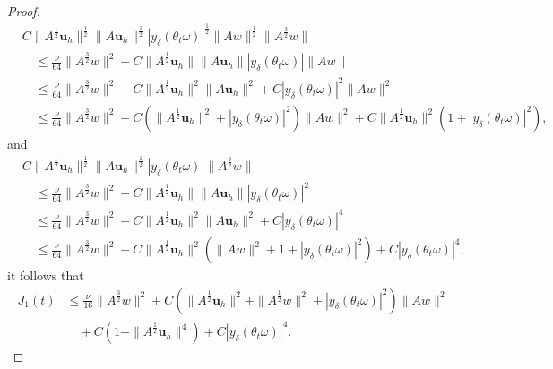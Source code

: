 \documentclass{elsarticle}
\theoremstyle{definition}
\numberwithin{equation}{section}
\begin{document}
\begin{proof}
\begin{align*}
  &C\|A^\frac12\textbf{u}_h\|^\frac12\|A\textbf{u}_h\|^\frac12 |y_\delta(\theta_t\omega)|^\frac12
\|Aw\|^\frac12\|A^\frac32w\|
& \nonumber\\
&\quad  \leq    \frac \nu {64} \|A^\frac32w\|^2  + C \|A^\frac12\textbf{u}_h\|  \|A \textbf{u}_h\|  |y_\delta(\theta_t\omega) |  \|Aw\|
\nonumber
\\
&\quad \leq     \frac \nu {64}\|A^\frac32w\|^2
+ C \|A^\frac12\textbf{u}_h\|^2  \|A \textbf{u}_h\|^2+    C| y_\delta(\theta_t\omega)|^2 \|Aw\|^2
\nonumber
\\
&\quad \leq     \frac \nu {64}\|A^\frac32w\|^2
+ C\left( \|A^\frac12\textbf{u}_h\|^2 +  |y_\delta(\theta_t\omega)|^2  \right) \|A w\|^2
+ C  \|A^\frac12\textbf{u}_h\|^2   \left(  1+ |y_\delta(\theta_t\omega) |^2  \right) ,
\end{align*}
and
\begin{align*}
  &C\|A^\frac12\textbf{u}_h\|^\frac12\|A\textbf{u}_h\|^\frac12 | y_\delta(\theta_t\omega)|  \|A^\frac32w\|
& \nonumber\\
&\quad \leq     \frac \nu {64}\|A^\frac32w\|^2  + C \|A^\frac12\textbf{u}_h\| \|A \textbf{u}_h\|   |y_\delta(\theta_t\omega)|^2
\nonumber
\\
&\quad \leq    \frac \nu {64}\|A^\frac32w\|^2
+ C \|A^\frac12\textbf{u}_h\|^2  \|A \textbf{u}_h\|^2   + C|y_\delta(\theta_t\omega) |^4
\nonumber
\\
&\quad \leq   \frac \nu {64}\|A^\frac32w\|^2
+ C  \|A^\frac12\textbf{u}_h\|^2     \left(  \|A w\|^2  +1+|y_\delta(\theta_t\omega) |^2  \right)
+ C|y_\delta(\theta_t\omega) |^4 ,
\end{align*}
it follows that
\begin{align}
J_1(t)
&\leq \frac  \nu {16}\|A^\frac32w\|^2
+C\left(\|A^\frac12\textbf{u}_h\|^2+\|A^\frac12w\|^2+|y_\delta(\theta_t\omega)|^2 \right)
\|Aw\|^2\nonumber\\
&\quad +C\left(1+\|A^\frac12\textbf{u}_h\|^4 \right)+C   |y_\delta(\theta_t\omega)|^4 .
\nonumber
\end{align}


\end{proof}
\end{document}
